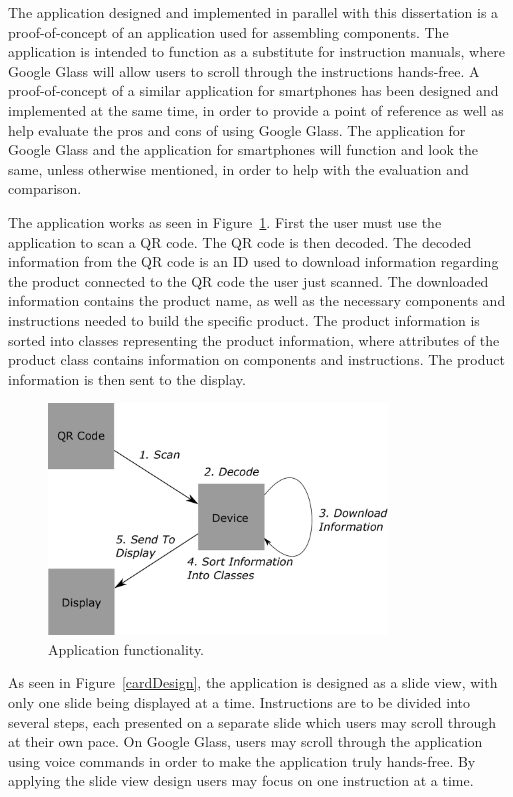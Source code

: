 The application designed and implemented in parallel with this dissertation is a proof-of-concept of an application used for assembling components. The application is intended to function as a substitute for  instruction manuals, where Google Glass will allow users to scroll through the instructions hands-free. A proof-of-concept of a similar application for smartphones has been designed and implemented at the same time, in order to provide a point of reference as well as help evaluate the pros and cons of using Google Glass. The application for Google Glass and the application for smartphones will function and look the same, unless otherwise mentioned, in order to help with the evaluation and comparison.

The application works as seen in Figure~\ref{projectmap}. First the user must use the application to scan a QR code. The QR code is then decoded. The decoded information from the QR code is an ID used to download information regarding the product connected to the QR code the user just scanned. The downloaded information contains the product name, as well as the necessary components and instructions needed to build the specific product. The product information is sorted into classes representing the product information, where attributes of the product class contains information on components and instructions.  The product information is then sent to the display.

	\begin{figure}[ht!]
		\centering
		\includegraphics[width=90mm]{images/projectmap4}
		\caption{Application functionality.}
		\label{projectmap}
	\end{figure}

As seen in Figure~\ref{cardDesign}, the application is designed as a slide view, with only one slide being displayed at a time. Instructions are to be divided into several steps, each presented on a separate slide which users may scroll through at their own pace. On Google Glass, users may scroll through the application using voice commands in order to make the application truly hands-free. By applying the slide view design users may focus on one instruction at a time. %

